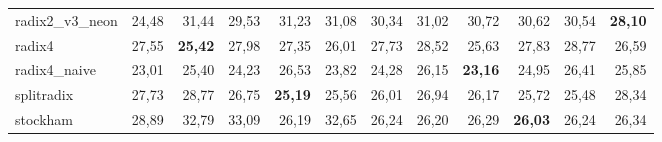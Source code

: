 \begin{table}[H]
\begin{tabular}{lrrrrrrrrrrr}
radix2\_v3\_neon & 24,48 & 31,44 & 29,53 & 31,23 & 31,08 & 30,34 & 31,02 & 30,72 & 30,62 & 30,54 & \textbf{28,10} \\
radix4 & 27,55 & \textbf{25,42} & 27,98 & 27,35 & 26,01 & 27,73 & 28,52 & 25,63 & 27,83 & 28,77 & 26,59 \\
radix4\_naive & 23,01 & 25,40 & 24,23 & 26,53 & 23,82 & 24,28 & 26,15 & \textbf{23,16} & 24,95 & 26,41 & 25,85 \\
splitradix & 27,73 & 28,77 & 26,75 & \textbf{25,19} & 25,56 & 26,01 & 26,94 & 26,17 & 25,72 & 25,48 & 28,34 \\
stockham & 28,89 & 32,79 & 33,09 & 26,19 & 32,65 & 26,24 & 26,20 & 26,29 & \textbf{26,03} & 26,24 & 26,34 \\
\bottomrule
\end{tabular}
\end{table}

